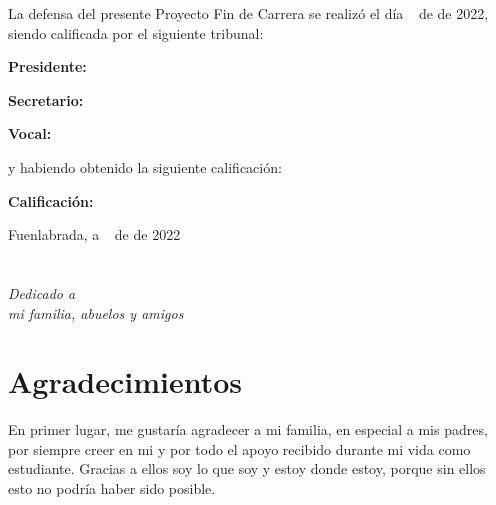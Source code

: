 \documentclass[a4paper, 12pt]{book}
\begin{document}
\vspace{1cm}
La defensa del presente Proyecto Fin de Carrera se realizó el día \qquad$\;\,$ de \qquad\qquad\qquad\qquad \newline de 2022, siendo calificada por el siguiente tribunal:


\vspace{0.5cm}
\textbf{Presidente:}

\vspace{1.2cm}
\textbf{Secretario:}

\vspace{1.2cm}
\textbf{Vocal:}


\vspace{1.2cm}
y habiendo obtenido la siguiente calificación:

\vspace{1cm}
\textbf{Calificación:}


\vspace{1cm}
\begin{flushright}
Fuenlabrada, a \qquad$\;\,$ de \qquad\qquad\qquad\qquad de 2022
\end{flushright}


\chapter*{}
\begin{flushright}
\textit{Dedicado a \\
mi familia, abuelos y amigos}
\end{flushright}


\chapter*{Agradecimientos}

En primer lugar, me gustaría agradecer a mi familia, en especial a mis padres, por siempre creer en mi y por todo el apoyo recibido durante mi vida como estudiante. Gracias a ellos soy lo que soy y estoy donde estoy, porque sin ellos esto no podría haber sido posible.
\end{document}
